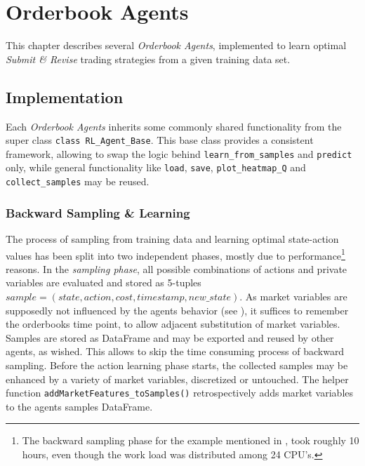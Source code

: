 \chapter{Orderbook Agents}
This chapter describes several \emph{Orderbook Agents}, implemented to learn optimal \emph{Submit \& Revise} trading strategies from a given training data set.


\section{Implementation}
\label{chap:experiments:implementation}
Each \emph{Orderbook Agents} inherits some commonly shared functionality from the super class \lstinline!class RL_Agent_Base!. This base class provides a consistent framework, allowing to swap the logic behind \lstinline!learn_from_samples! and \lstinline!predict! only, while general functionality like \lstinline!load!, \lstinline!save!, \lstinline!plot_heatmap_Q! and \lstinline!collect_samples! may be reused.



\subsection{Backward Sampling \& Learning}
The process of sampling from training data and learning optimal state-action values has been split into two independent phases, mostly due to performance\footnote{The backward sampling phase for the example mentioned in , took roughly 10 hours, even though the work load was distributed among 24 CPU's.} reasons. In the \emph{sampling phase}, all possible combinations of actions and private variables are evaluated and stored as 5-tuples $sample=(state, action, cost, timestamp, new\_state)$. As market variables are supposedly not influenced by the agents behavior (see ), it suffices to remember the orderbooks time point, to allow adjacent substitution of market variables.\\

Samples are stored as DataFrame and may be exported and reused by other agents, as wished. This allows to skip the time consuming process of backward sampling. Before the action learning phase starts, the collected samples may be enhanced by a variety of market variables, discretized or untouched. The helper function \lstinline!addMarketFeatures_toSamples()! retrospectively adds market variables to the agents samples DataFrame.\\

